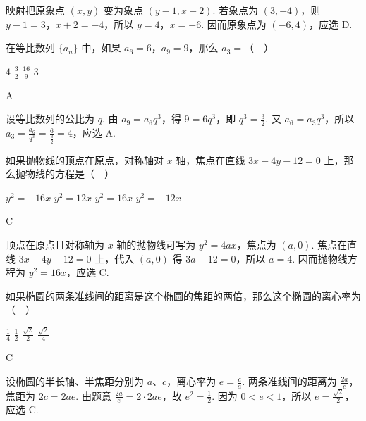 \begin{solution}
映射把原象点 \((x,y)\) 变为象点 \((y-1,x+2)\). 若象点为 \((3,-4)\)，则
\(y-1=3\)，\(x+2=-4\)，所以 \(y=4\)，\(x=-6\). 因而原象点为 \((-6,4)\)，应选 D.
\end{solution}

\begin{problem}
在等比数列 \(\{a_n\}\) 中，如果 \(a_6=6\)，\(a_9=9\)，那么 \(a_3=\)（\(\quad\)）

\choices
    {\(4\)}
    {\(\frac{3}{2}\)}
    {\(\frac{16}{9}\)}
    {\(3\)}
\end{problem}

\begin{answer}
A
\end{answer}

\begin{solution}
设等比数列的公比为 \(q\). 由 \(a_9=a_6q^3\)，得 \(9=6q^3\)，即 \(q^3=\frac32\). 又 \(a_6=a_3q^3\)，所以
\(a_3=\frac{a_6}{q^3}=\frac{6}{\frac{3}{2}}=4\)，应选 A.
\end{solution}

\begin{problem}
如果抛物线的顶点在原点，对称轴对 \(x\) 轴，焦点在直线 \(3x-4y-12=0\) 上，那么抛物线的方程是（\(\quad\)）

\choices
    {\(y^2=-16x\)}
    {\(y^2=12x\)}
    {\(y^2=16x\)}
    {\(y^2=-12x\)}
\end{problem}

\begin{answer}
C
\end{answer}

\begin{solution}
顶点在原点且对称轴为 \(x\) 轴的抛物线可写为 \(y^2=4ax\)，焦点为 \((a,0)\). 焦点在直线 \(3x-4y-12=0\) 上，代入 \((a,0)\) 得 \(3a-12=0\)，所以 \(a=4\). 因而抛物线方程为 \(y^2=16x\)，应选 C.
\end{solution}

\begin{problem}
如果椭圆的两条准线间的距离是这个椭圆的焦距的两倍，那么这个椭圆的离心率为（\(\quad\)）

\choices
    {\(\frac{1}{4}\)}
    {\(\frac{1}{2}\)}
    {\(\frac{\sqrt{2}}{2}\)}
    {\(\frac{\sqrt{2}}{4}\)}
\end{problem}

\begin{answer}
C
\end{answer}

\begin{solution}
设椭圆的半长轴、半焦距分别为 \(a\)、\(c\)，离心率为 \(e=\frac ca\). 两条准线间的距离为 \(\frac{2a}{e}\)，焦距为 \(2c=2ae\). 由题意
\(\frac{2a}{e}=2\cdot2ae\)，故 \(e^2=\frac12\). 因为 \(0<e<1\)，所以 \(e=\frac{\sqrt2}{2}\)，应选 C.
\end{solution}

